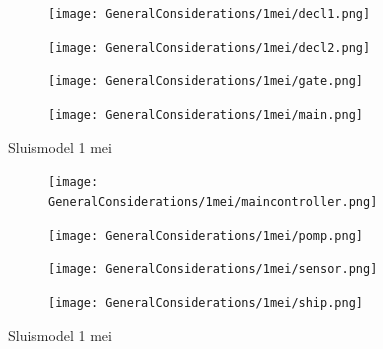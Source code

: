 \documentclass{article}
\begin{document}
	
	
	\begin{figure}
		\centering
		\begin{subfigure}{0.45\linewidth}
			\texttt{[image: GeneralConsiderations/1mei/decl1.png]} %
			\caption{}
			\label{fig:1a}
		\end{subfigure}\hfill
		\begin{subfigure}{0.45\linewidth}
			\texttt{[image: GeneralConsiderations/1mei/decl2.png]}
			\caption{}
			\label{fig:1a}
		\end{subfigure}
		
		\begin{subfigure}{0.45\linewidth}
			\texttt{[image: GeneralConsiderations/1mei/gate.png]}
			\caption{}
			\label{fig:1a}
		\end{subfigure}\hfill
		\begin{subfigure}{0.45\linewidth}
			\texttt{[image: GeneralConsiderations/1mei/main.png]}
			\caption{}
			\label{fig:1a}
		\end{subfigure}
		\caption{Sluismodel 1 mei}
		\label{fig:1}
	\end{figure}
	
	
	
	
	\begin{figure}
		\centering
		\begin{subfigure}{0.45\linewidth}
			\texttt{[image: GeneralConsiderations/1mei/maincontroller.png]} 
			\caption{}
			\label{fig:1a}
		\end{subfigure}\hfill
		\begin{subfigure}{0.45\linewidth}
			\texttt{[image: GeneralConsiderations/1mei/pomp.png]}
			\caption{}
			\label{fig:1a}
		\end{subfigure}
		
		\begin{subfigure}{0.45\linewidth}
			\texttt{[image: GeneralConsiderations/1mei/sensor.png]}
			\caption{}
			\label{fig:1a}
		\end{subfigure}\hfill
		\begin{subfigure}{0.45\linewidth}
			\texttt{[image: GeneralConsiderations/1mei/ship.png]}
			\caption{}
			\label{fig:1a}
		\end{subfigure}
		\caption{Sluismodel 1 mei}
		\label{fig:1}
	\end{figure}
	
	
	
\end{document}
